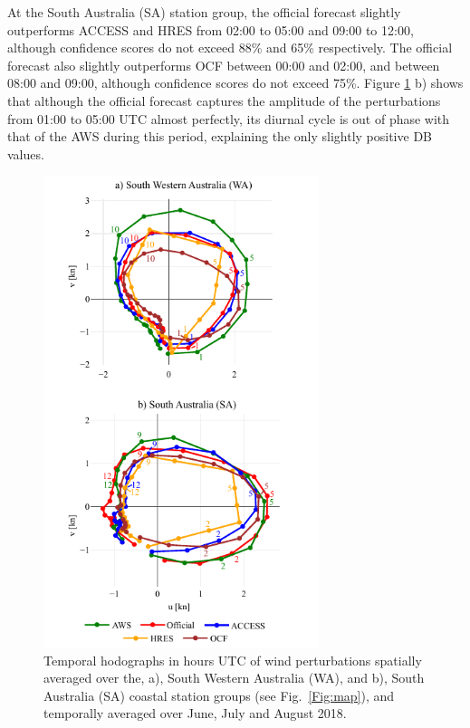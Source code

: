 \documentclass[twocol]{ametsoc}
\begin{document}
At the South Australia (SA) station group, the official forecast slightly outperforms ACCESS and HRES from 02:00 to 05:00 and 09:00 to 12:00, although confidence scores do not exceed 88\% and 65\% respectively. The official forecast also slightly outperforms OCF between 00:00 and 02:00, and between 08:00 and 09:00, although confidence scores do not exceed 75\%. Figure \ref{Fig:clim_hodo} b) shows that although the official forecast captures the amplitude of the perturbations from 01:00 to 05:00 UTC almost perfectly, its diurnal cycle is out of phase with that of the AWS during this period, explaining the only slightly positive DB values.

\begin{figure}
\centering
\includegraphics[width=19pc]{clim_hodo_alt.pdf}
\caption{Temporal hodographs in hours UTC of wind perturbations spatially averaged over the, a), South Western Australia (WA), and b), South Australia (SA) coastal station groups (see Fig.~\ref{Fig:map}), and temporally averaged over June, July and August 2018.}
\label{Fig:clim_hodo}
\end{figure}
\end{document}

